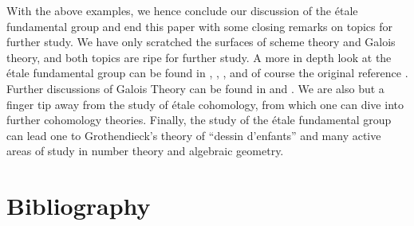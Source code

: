 \documentclass[11pt,openany]{book} %
\begin{document}
With the above examples, we hence conclude our discussion of the \'etale fundamental group and end this paper with some closing remarks on topics for further study. We have only scratched the surfaces of scheme theory and Galois theory, and both topics are ripe for further study. A more in depth look at the \'etale fundamental group can be found in \cite{milne}, \cite{milne2}, \cite{tsimerman}, and of course the original reference \cite{grothendiecksga}. Further discussions of Galois Theory can be found in \cite{szamuely} and \cite{borceaux}. We are also but a finger tip away from the study of \'etale cohomology, from which one can dive into further cohomology theories. Finally, the study of the \'etale fundamental group can lead one to Grothendieck's theory of ``dessin d'enfants'' and many active areas of study in number theory and algebraic geometry.

\chapter*{Bibliography}
\printbibliography[heading=bibempty,type=book]



\end{document}

